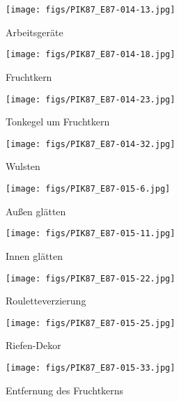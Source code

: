 \begin{figure*}[p]
	\centering
	\begin{subfigure}[t]{0.32\textwidth}
		\centering
		\texttt{[image: figs/PIK87\_E87-014-13.jpg]}
		\caption{Arbeitsgeräte}
		\label{fig:PIK87_Töpferei_a}
	\end{subfigure}
	\begin{subfigure}[t]{0.32\textwidth}
		\centering
		\texttt{[image: figs/PIK87\_E87-014-18.jpg]}
		\caption{Fruchtkern}
		\label{fig:PIK87_Töpferei_b}
	\end{subfigure}
	\begin{subfigure}[t]{0.32\textwidth}
		\centering
		\texttt{[image: figs/PIK87\_E87-014-23.jpg]}
		\caption{Tonkegel um Fruchtkern}
		\label{fig:PIK87_Töpferei_c}
	\end{subfigure}
	\begin{subfigure}[t]{0.32\textwidth}
		\centering
		\texttt{[image: figs/PIK87\_E87-014-32.jpg]}
		\caption{Wulsten}
		\label{fig:PIK87_Töpferei_d}
	\end{subfigure}
	\begin{subfigure}[t]{0.32\textwidth}
		\centering
		\texttt{[image: figs/PIK87\_E87-015-6.jpg]}
		\caption{Außen glätten}
		\label{fig:PIK87_Töpferei_e}
	\end{subfigure}
	\begin{subfigure}[t]{0.32\textwidth}
		\centering
		\texttt{[image: figs/PIK87\_E87-015-11.jpg]}
		\caption{Innen glätten}
		\label{fig:PIK87_Töpferei_f}
	\end{subfigure}
	\begin{subfigure}[t]{0.32\textwidth}
		\centering
		\texttt{[image: figs/PIK87\_E87-015-22.jpg]}
		\caption{Rouletteverzierung}
		\label{fig:PIK87_Töpferei_g}
	\end{subfigure}
	\begin{subfigure}[t]{0.32\textwidth}
		\centering
		\texttt{[image: figs/PIK87\_E87-015-25.jpg]}
		\caption{Riefen-Dekor}
		\label{fig:PIK87_Töpferei_h}
	\end{subfigure}
	\begin{subfigure}[t]{0.32\textwidth}
		\centering
		\texttt{[image: figs/PIK87\_E87-015-33.jpg]}
		\caption{Entfernung des Fruchtkerns}
		\label{fig:PIK87_Töpferei_i}
	\end{subfigure}
	\begin{subfigure}[t]{0.32\textwidth}

\end{subfigure}
\end{figure*}
